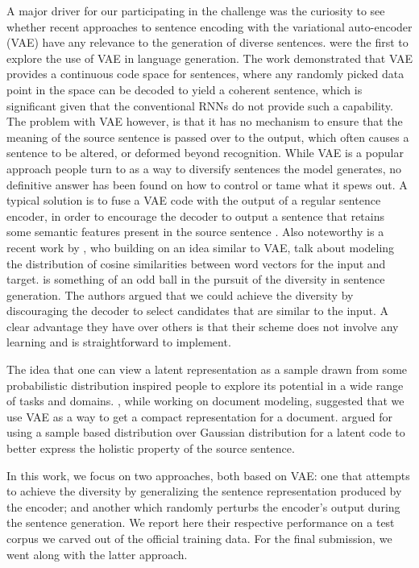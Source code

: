 \documentclass[dvipdfmx,11pt,a4paper]{article}
\begin{document}
A major driver for  our participating in the challenge was the curiosity to  see  whether recent approaches to sentence encoding with the  variational auto-encoder (VAE) have any relevance to the generation of diverse sentences.  \cite{bowman-etal-2016-generating} were the first to explore the use of VAE in language generation. The work demonstrated that VAE provides a continuous code space for sentences, where any randomly picked data point in the space can be decoded to yield a coherent sentence, which is significant given that  the conventional RNNs do not provide such a capability. The problem with VAE however, is  that it has no mechanism to ensure that the meaning of the source sentence is passed over to the output, which often causes  a sentence to be altered, or deformed beyond recognition. While VAE is a popular  approach people turn to  as a way to diversify sentences the model generates, no definitive answer has been found on how to control or tame what it spews out.   A typical solution is to fuse a VAE code with the output of a regular sentence encoder,  in order to encourage the decoder to output a sentence that retains some semantic features present in the source sentence \cite{gupta:2017}.  Also noteworthy is a recent work  by  \cite {guu-etal-2018-generating}, who building on an idea similar to VAE, talk about modeling the distribution of cosine similarities between word vectors for the  input and target.   \cite{DBLP:journals/corr/LiGBGD15} is something of an odd ball in the pursuit of the diversity in sentence generation. The authors argued that we could achieve the diversity by discouraging the decoder to select candidates that are similar to the input.  A clear advantage they have over others is that their scheme does not involve any learning and is straightforward to implement.  

\par The idea that one can view a latent representation as a sample drawn from some probabilistic distribution inspired people to explore its potential in a wide range of  tasks and domains. \cite{DBLP:journals/corr/MiaoYB15}, while working on document modeling, suggested that we  use VAE as a way to get a compact representation for a document.
\cite{Fang2019ImplicitDL}  argued for using a sample based distribution over  Gaussian distribution for a latent code to better express the holistic property of the source sentence. 
\par In this work, we focus on  two approaches, both based on VAE: one that attempts to achieve the diversity by   generalizing the sentence representation produced by the encoder; and another which randomly perturbs the encoder's output during the sentence generation.  We report  here  their respective performance on a test corpus we carved out of the official training data.   For the final submission, we went along  with the latter approach.
\end{document}
